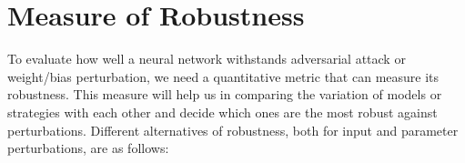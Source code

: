 \documentclass[ %
                    author={Revalda Putawara},
                supervisor={Dr. James Pope},
                    degree={MSc},
                     title={Robustness of Bayesian Neural Networks Design Choices Against Weight and Bias Perturbation Induced by Single Event Upsets (SEUs)},
                      type={},
                      year={2025}]{dissertation}
\begin{document}



\section{Measure of Robustness} \label{section:robmeasuretheory}

To evaluate how well a neural network withstands adversarial attack or weight/bias perturbation, we need a quantitative metric that can measure its robustness. This measure will help us in comparing the variation of models or strategies with each other and decide which ones are the most robust against perturbations. Different alternatives of robustness, both for input and parameter perturbations, are as follows:
\end{document}
